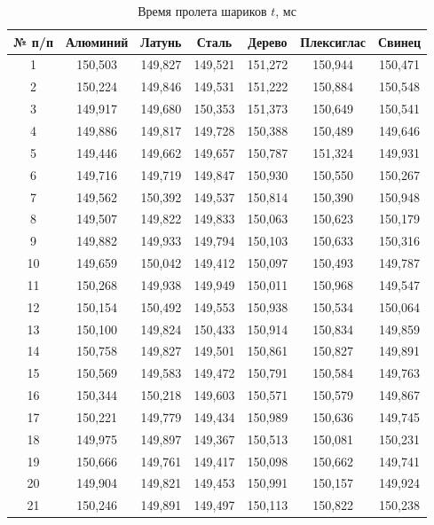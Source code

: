 \documentclass[a4paper,14pt]{extarticle}
\theoremstyle{plain}
\theoremstyle{remark}
\theoremstyle{definition}
\begin{document}
\begin{table}[H]
\centering
\caption{Время пролета шариков $t$, мс}
\label{tabl:2}
\begin{tabular}{|c|c|c|c|c|c|c|}
\hline
№ п/п & Алюминий & Латунь & Сталь & Дерево & Плексиглас & Свинец \\
\hline
1 & 150,503 & 149,827 & 149,521 & 151,272 & 150,944 & 150,471 \\
\hline
2 & 150,224 & 149,846 & 149,531 & 151,222 & 150,884 & 150,548 \\
\hline
3 & 149,917 & 149,680 & 150,353 & 151,373 & 150,649 & 150,541 \\
\hline
4 & 149,886 & 149,817 & 149,728 & 150,388 & 150,489 & 149,646 \\
\hline
5 & 149,446 & 149,662 & 149,657 & 150,787 & 151,324 & 149,931 \\
\hline
6 & 149,716 & 149,719 & 149,847 & 150,930 & 150,550 & 150,267 \\
\hline
7 & 149,562 & 150,392 & 149,537 & 150,814 & 150,390 & 150,948 \\
\hline
8 & 149,507 & 149,822 & 149,833 & 150,063 & 150,623 & 150,179 \\
\hline
9 & 149,882 & 149,933 & 149,794 & 150,103 & 150,633 & 150,316 \\
\hline
10 & 149,659 & 150,042 & 149,412 & 150,097 & 150,493 & 149,787 \\
\hline
11 & 150,268 & 149,938 & 149,949 & 150,011 & 150,968 & 149,547 \\
\hline
12 & 150,154 & 150,492 & 149,553 & 150,938 & 150,534 & 150,064 \\
\hline
13 & 150,100 & 149,824 & 150,433 & 150,914 & 150,834 & 149,859 \\
\hline
14 & 150,758 & 149,827 & 149,501 & 150,861 & 150,827 & 149,891 \\
\hline
15 & 150,569 & 149,583 & 149,472 & 150,791 & 150,584 & 149,763 \\
\hline
16 & 150,344 & 150,218 & 149,603 & 150,571 & 150,579 & 149,867 \\
\hline
17 & 150,221 & 149,779 & 149,434 & 150,989 & 150,636 & 149,745 \\
\hline
18 & 149,975 & 149,897 & 149,367 & 150,513 & 150,081 & 150,231 \\
\hline
19 & 150,666 & 149,761 & 149,417 & 150,098 & 150,662 & 149,741 \\
\hline
20 & 149,904 & 149,821 & 149,453 & 150,991 & 150,157 & 149,924 \\
\hline
21 & 150,246 & 149,891 & 149,497 & 150,113 & 150,822 & 150,238 \\

\end{tabular}
\end{table}
\end{document}
